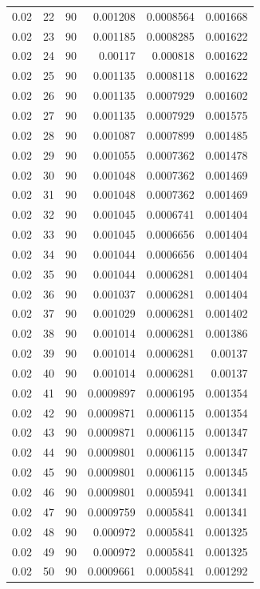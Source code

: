 \begin{tabular}{rrrrrr}
0.02 & 22 & 90 & 0.001208 & 0.0008564 & 0.001668 \\
0.02 & 23 & 90 & 0.001185 & 0.0008285 & 0.001622 \\
0.02 & 24 & 90 & 0.00117 & 0.000818 & 0.001622 \\
0.02 & 25 & 90 & 0.001135 & 0.0008118 & 0.001622 \\
0.02 & 26 & 90 & 0.001135 & 0.0007929 & 0.001602 \\
0.02 & 27 & 90 & 0.001135 & 0.0007929 & 0.001575 \\
0.02 & 28 & 90 & 0.001087 & 0.0007899 & 0.001485 \\
0.02 & 29 & 90 & 0.001055 & 0.0007362 & 0.001478 \\
0.02 & 30 & 90 & 0.001048 & 0.0007362 & 0.001469 \\
0.02 & 31 & 90 & 0.001048 & 0.0007362 & 0.001469 \\
0.02 & 32 & 90 & 0.001045 & 0.0006741 & 0.001404 \\
0.02 & 33 & 90 & 0.001045 & 0.0006656 & 0.001404 \\
0.02 & 34 & 90 & 0.001044 & 0.0006656 & 0.001404 \\
0.02 & 35 & 90 & 0.001044 & 0.0006281 & 0.001404 \\
0.02 & 36 & 90 & 0.001037 & 0.0006281 & 0.001404 \\
0.02 & 37 & 90 & 0.001029 & 0.0006281 & 0.001402 \\
0.02 & 38 & 90 & 0.001014 & 0.0006281 & 0.001386 \\
0.02 & 39 & 90 & 0.001014 & 0.0006281 & 0.00137 \\
0.02 & 40 & 90 & 0.001014 & 0.0006281 & 0.00137 \\
0.02 & 41 & 90 & 0.0009897 & 0.0006195 & 0.001354 \\
0.02 & 42 & 90 & 0.0009871 & 0.0006115 & 0.001354 \\
0.02 & 43 & 90 & 0.0009871 & 0.0006115 & 0.001347 \\
0.02 & 44 & 90 & 0.0009801 & 0.0006115 & 0.001347 \\
0.02 & 45 & 90 & 0.0009801 & 0.0006115 & 0.001345 \\
0.02 & 46 & 90 & 0.0009801 & 0.0005941 & 0.001341 \\
0.02 & 47 & 90 & 0.0009759 & 0.0005841 & 0.001341 \\
0.02 & 48 & 90 & 0.000972 & 0.0005841 & 0.001325 \\
0.02 & 49 & 90 & 0.000972 & 0.0005841 & 0.001325 \\
0.02 & 50 & 90 & 0.0009661 & 0.0005841 & 0.001292 \\

\end{tabular}

